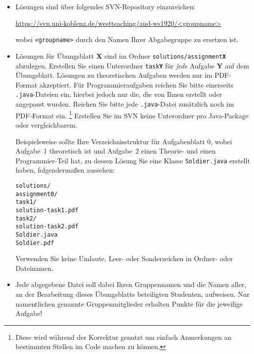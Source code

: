 \documentclass[german, solution]{acAssignment}
\begin{document}
\begin{itemize}
    \item Lösungen sind über folgendes SVN-Repository einzureichen:
    
        \url{https://svn.uni-koblenz.de/westteaching/aud-ws1920/<groupname>}
        
        wobei \texttt{<groupname>} durch den Namen Ihrer Abgabegruppe zu ersetzen ist.
    
    \item Lösungen für Übungsblatt \textbf{X} sind im Ordner \texttt{solutions/assignment\textbf{X}} abzulegen.
        Erstellen Sie einen Unterordner \texttt{task\textbf{Y}} für \emph{jede} Aufgabe \textbf{Y} auf dem Übungsblatt.
        Lösungen zu theoretischen Aufgaben werden nur im PDF-Format akzeptiert.
        Für Programmieraufgaben reichen Sie bitte einerseits \texttt{.java}-Dateien ein, hierbei jedoch nur die, die von Ihnen erstellt oder angepasst wurden.
        Reichen Sie bitte jede \texttt{.java}-Datei zusätzlich noch im PDF-Format ein.%
        \footnote{Diese wird während der Korrektur genutzt um einfach Anmerkungen an bestimmten Stellen im Code machen zu können.}
        Erstellen Sie im SVN keine Unterordner pro Java-Package oder vergleichbarem.
        
        Beispielsweise sollte Ihre Verzeichnisstruktur für Aufgabenblatt 0, wobei Aufgabe~1 theoretisch ist und Aufgabe~2 einen Theorie- und einen Programmier-Teil hat, zu dessen Lösung Sie eine Klasse \texttt{Soldier.java} erstellt haben, folgendermaßen aussehen:
        
        \texttt{solutions/\\
        \phantom{xx}assignment0/\\
        \phantom{xxxx}task1/\\
        \phantom{xxxxxx}solution-task1.pdf\\
        \phantom{xxxx}task2/\\
        \phantom{xxxxxx}solution-task2.pdf\\
        \phantom{xxxxxx}Soldier.java\\
        \phantom{xxxxxx}Soldier.pdf}
        
        Verwenden Sie keine Umlaute, Leer- oder Sonderzeichen in Ordner- oder Dateinamen.
    
    \item Jede abgegebene Datei soll dabei Ihren Gruppennamen und die Namen aller, an der Bearbeitung dieses Übungsblatts beteiligten Studenten, aufweisen.
        Nur namentlichen genannte Gruppenmitglieder erhalten Punkte für die jeweilige Aufgabe!
    

\end{itemize}
\end{document}
